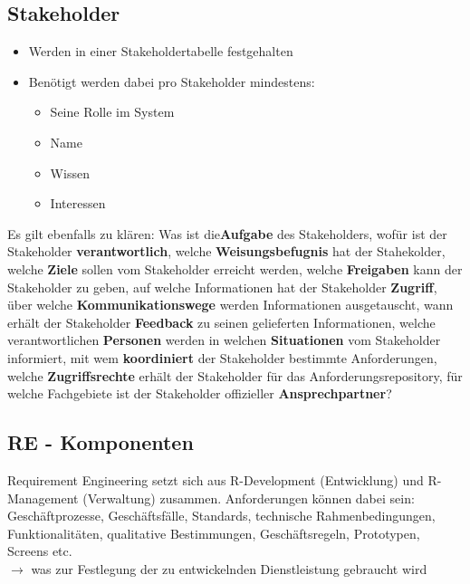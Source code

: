 \documentclass[a4paper]{article}
\begin{document}
		\subsection{Stakeholder}
		
		\begin{itemize}
			\item Werden in einer Stakeholdertabelle festgehalten
			\item Benötigt werden dabei pro Stakeholder mindestens:
				\begin{itemize}
					\item Seine Rolle im System
					\item Name
					\item Wissen
					\item Interessen
				\end{itemize}
		\end{itemize}
		\vspace{1em}
		\noindent
		Es gilt ebenfalls zu klären:
		Was ist die\textbf{Aufgabe} des Stakeholders, wofür ist der Stakeholder \textbf{verantwortlich}, welche \textbf{Weisungsbefugnis} hat der Stahekolder, welche \textbf{Ziele} sollen vom Stakeholder erreicht werden, welche \textbf{Freigaben} kann der Stakeholder zu geben, auf welche Informationen hat der Stakeholder \textbf{Zugriff}, über welche \textbf{Kommunikationswege} werden Informationen ausgetauscht, wann erhält der Stakeholder \textbf{Feedback} zu seinen gelieferten Informationen, welche verantwortlichen \textbf{Personen} werden in welchen \textbf{Situationen} vom Stakeholder informiert, mit wem \textbf{koordiniert} der Stakeholder bestimmte Anforderungen, welche \textbf{Zugriffsrechte} erhält der Stakeholder für das Anforderungsrepository, für welche Fachgebiete ist der Stakeholder offizieller \textbf{Ansprechpartner}?
		
\newpage

		\subsection{RE - Komponenten}
			
		Requirement Engineering setzt sich aus R-Development (Entwicklung) und R-Management (Verwaltung) zusammen.
		Anforderungen können dabei sein: Geschäftprozesse, Geschäftsfälle, Standards, technische Rahmenbedingungen, Funktionalitäten, qualitative Bestimmungen, Geschäftsregeln, Prototypen, Screens etc.\\
		$\rightarrow$ was zur Festlegung der zu entwickelnden Dienstleistung gebraucht wird
		
\end{document}
